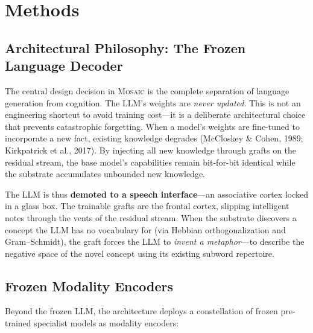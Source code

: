 \section{Methods}
\label{sec:methods}

\subsection{Architectural Philosophy: The Frozen Language Decoder}

The central design decision in \textsc{Mosaic} is the complete separation of
language generation from cognition.  The LLM's weights are \emph{never updated}.
This is not an engineering shortcut to avoid training cost---it is a deliberate
architectural choice that prevents catastrophic forgetting.  When a model's
weights are fine-tuned to incorporate a new fact, existing knowledge degrades
(McCloskey \& Cohen, 1989; Kirkpatrick et al., 2017).  By injecting all new
knowledge through grafts on the residual stream, the base model's capabilities
remain bit-for-bit identical while the substrate accumulates unbounded new
knowledge.

The LLM is thus \textbf{demoted to a speech interface}---an associative cortex
locked in a glass box.  The trainable grafts are the frontal cortex, slipping
intelligent notes through the vents of the residual stream.  When the substrate
discovers a concept the LLM has no vocabulary for (via Hebbian
orthogonalization and Gram--Schmidt), the graft forces the LLM to \emph{invent a
metaphor}---to describe the negative space of the novel concept using its
existing subword repertoire.

\subsection{Frozen Modality Encoders}

Beyond the frozen LLM, the architecture deploys a constellation
of frozen pre-trained specialist models as modality encoders:

